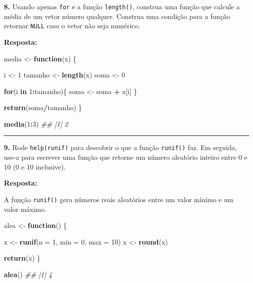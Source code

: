 \documentclass[]{book}
\newenvironment{Shaded}{\begin{snugshade}}{\end{snugshade}}
\newcommand{\CommentTok}[1]{\textcolor[rgb]{0.56,0.35,0.01}{\textit{#1}}}
\newcommand{\ControlFlowTok}[1]{\textcolor[rgb]{0.13,0.29,0.53}{\textbf{#1}}}
\newcommand{\DataTypeTok}[1]{\textcolor[rgb]{0.13,0.29,0.53}{#1}}
\newcommand{\DecValTok}[1]{\textcolor[rgb]{0.00,0.00,0.81}{#1}}
\newcommand{\KeywordTok}[1]{\textcolor[rgb]{0.13,0.29,0.53}{\textbf{#1}}}
\newcommand{\NormalTok}[1]{#1}
\newcommand{\OperatorTok}[1]{\textcolor[rgb]{0.81,0.36,0.00}{\textbf{#1}}}
\newcommand{\StringTok}[1]{\textcolor[rgb]{0.31,0.60,0.02}{#1}}
\begin{document}
\textbf{8.} Usando apenas \texttt{for} e a função \texttt{length()}, construa uma função que calcule a média de um vetor número qualquer. Construa uma condição para a função retornar \texttt{NULL} caso o vetor não seja numérico.

\textbf{Resposta:}

\begin{Shaded}
\begin{Highlighting}[]
\NormalTok{media <-}\StringTok{ }\ControlFlowTok{function}\NormalTok{(x) \{}
  
\NormalTok{  i <-}\StringTok{ }\DecValTok{1}
\NormalTok{  tamanho <-}\StringTok{ }\KeywordTok{length}\NormalTok{(x)}
\NormalTok{  soma <-}\StringTok{ }\DecValTok{0}
  
  \ControlFlowTok{for}\NormalTok{(i }\ControlFlowTok{in} \DecValTok{1}\OperatorTok{:}\NormalTok{tamanho)\{}
\NormalTok{    soma <-}\StringTok{ }\NormalTok{soma }\OperatorTok{+}\StringTok{ }\NormalTok{x[i]}
\NormalTok{  \}}
  
  \KeywordTok{return}\NormalTok{(soma}\OperatorTok{/}\NormalTok{tamanho)}
\NormalTok{\}}

\KeywordTok{media}\NormalTok{(}\DecValTok{1}\OperatorTok{:}\DecValTok{3}\NormalTok{)}
\CommentTok{## [1] 2}
\end{Highlighting}
\end{Shaded}

\begin{center}\rule{0.5\linewidth}{0.5pt}\end{center}

\textbf{9.} Rode \texttt{help(runif)} para descobrir o que a função \texttt{runif()} faz. Em seguida, use-a para escrever uma função que retorne um número aleatório inteiro entre 0 e 10 (0 e 10 inclusive).

\textbf{Resposta:}

A função \texttt{runif()} gera números reais aleatórios entre um valor mínimo e um valor máximo.

\begin{Shaded}
\begin{Highlighting}[]
\NormalTok{alea <-}\StringTok{ }\ControlFlowTok{function}\NormalTok{() \{}
  
\NormalTok{  x <-}\StringTok{ }\KeywordTok{runif}\NormalTok{(}\DataTypeTok{n =} \DecValTok{1}\NormalTok{, }\DataTypeTok{min =} \DecValTok{0}\NormalTok{, }\DataTypeTok{max =} \DecValTok{10}\NormalTok{)}
\NormalTok{  x <-}\StringTok{ }\KeywordTok{round}\NormalTok{(x)}
  
  \KeywordTok{return}\NormalTok{(x)}
\NormalTok{\}}

\KeywordTok{alea}\NormalTok{()}
\CommentTok{## [1] 4}
\end{Highlighting}
\end{Shaded}
\end{document}
